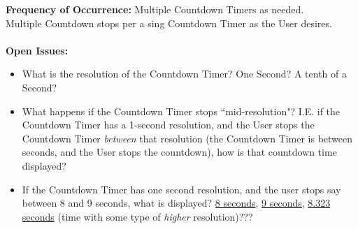 \documentclass[letterpaper]{article}
\begin{document}
\textbf{Frequency of Occurrence:  }Multiple Countdown Timers as
needed.\\
Multiple Countdown stops per a sing Countdown Timer as the User
desires.\\\\
\textbf{Open Issues:  }
\begin{itemize}
\item What is the resolution of the Countdown Timer? One Second? A tenth of a
Second?
\item What happens if the Countdown Timer stops ``mid-resolution"? I.E.
if the Countdown Timer has a 1-second resolution, and the User stops
the Countdown Timer \textit{between} that resolution (the Countdown
Timer is between seconds, and the User stops the countdown), how is
that countdown time displayed?
\item If the Countdown Timer has one second resolution, and the user
stops say between 8 and 9 seconds, what is displayed?
\underline{8 seconds}, \underline{9 seconds}, \underline{8.323 seconds}
(time with some type of \textit{higher} resolution)???
\end{itemize}
\end{document}
